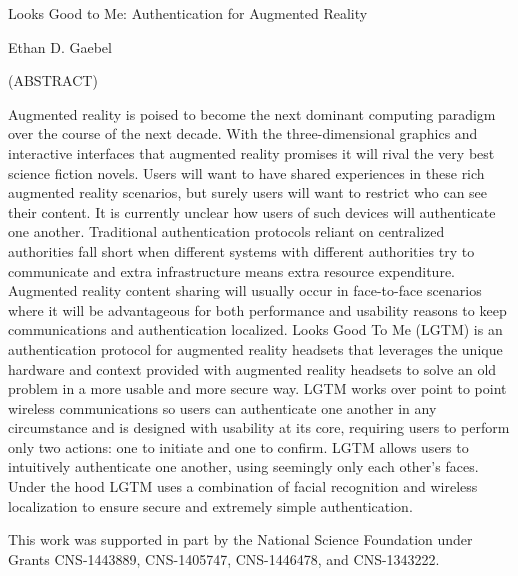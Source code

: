 \documentclass[12pt]{report}
\begin{document}
\thispagestyle{empty}
\begin{center}

{\large Looks Good to Me: 
Authentication for Augmented Reality}

\vfill

Ethan D. Gaebel

\vfill

(ABSTRACT)

Augmented reality is poised to become the next dominant computing paradigm over the course of the next decade. With the three-dimensional graphics and interactive interfaces that augmented reality promises it will rival the very best science fiction novels. Users will want to have shared experiences in these rich augmented reality scenarios, but surely users will want to restrict who can see their content. It is currently unclear how users of such devices will authenticate one another. Traditional authentication protocols reliant on centralized authorities fall short when different systems with different authorities try to communicate and extra infrastructure means extra resource expenditure. Augmented reality content sharing will usually occur in face-to-face scenarios where it will be advantageous for both performance and usability reasons to keep communications and authentication localized. Looks Good To Me (LGTM) is an authentication protocol for augmented reality headsets that leverages the unique hardware and context provided with augmented reality headsets to solve an old problem in a more usable and more secure way. LGTM works over point to point wireless communications so users can authenticate one another in any circumstance and is designed with usability at its core, requiring users to perform only two actions: one to initiate and one to confirm. LGTM allows users to intuitively authenticate one another, using seemingly only each other's faces. Under the hood LGTM uses a combination of facial recognition and wireless localization to ensure secure and extremely simple authentication.

\vfill

\end{center}

\vfill

This work was supported in part by the National Science Foundation under Grants 
CNS-1443889, CNS-1405747, CNS-1446478, and CNS-1343222.

\pagebreak

\end{document}
